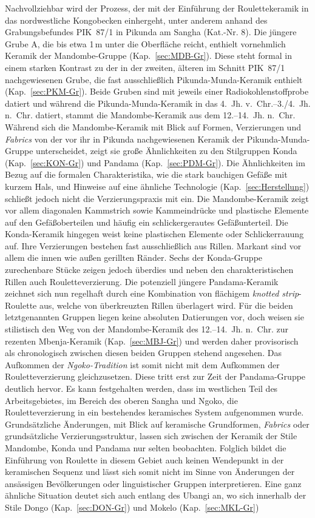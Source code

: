 Nachvollziehbar wird der Prozess, der mit der Einführung der Roulettekeramik in das nordwestliche Kongobecken einhergeht, unter anderem anhand des Grabungsbefundes PIK~87/1 in Pikunda am \mbox{Sangha} (Kat.-Nr. 8). Die jüngere Grube A, die bis etwa 1\,m unter die Oberfläche reicht, enthielt vornehmlich Keramik der Mandombe-Gruppe (Kap.~\ref{sec:MDB-Gr}). Diese steht formal in einem starken Kontrast zu der in der zweiten, älteren im Schnitt PIK~87/1 nachgewiesenen Grube, die fast ausschließlich Pikunda-Munda-Keramik enthielt (Kap.~\ref{sec:PKM-Gr}). Beide Gruben sind mit jeweils einer Radiokohlenstoffprobe datiert und während die Pikunda-Munda-Keramik in das 4.~Jh. v.~Chr.--3./4.~Jh. n.~Chr. datiert, stammt die Mandombe-Keramik aus dem 12.--14.~Jh. n.~Chr. Während sich die Mandombe-Keramik mit Blick auf Formen, Verzierungen und \textit{Fabrics} von der vor ihr in Pikunda nachgewiesenen Keramik der Pikunda-Munda-Gruppe unterscheidet, zeigt sie große Ähnlichkeiten zu den Stilgruppen Konda (Kap.~\ref{sec:KON-Gr}) und Pandama (Kap.~\ref{sec:PDM-Gr}). Die Ähnlichkeiten im Bezug auf die formalen Charakteristika, wie die stark bauchigen Gefäße mit kurzem Hals, und Hinweise auf eine ähnliche Technologie (Kap.~\ref{sec:Herstellung}) schließt jedoch nicht die Verzierungspraxis mit ein. Die Mandombe-Keramik zeigt vor allem diagonalen Kammstrich sowie Kammeindrücke und plastische Elemente auf den Gefäßoberteilen und häufig ein schlickergerautes Gefäßunterteil. Die Konda-Keramik hingegen weist keine plastischen Elemente oder Schlickerrauung auf. Ihre Verzierungen bestehen fast ausschließlich aus Rillen. Markant sind vor allem die innen wie außen gerillten Ränder. Sechs der Konda-Gruppe zurechenbare Stücke zeigen jedoch überdies und neben den charakteristischen Rillen auch Rouletteverzierung. Die potenziell jüngere Pandama-Keramik zeichnet sich nun regelhaft durch eine Kombination von flächigem \textit{knotted strip}-Roulette aus, welche von überkreuzten Rillen überlagert wird. Für die beiden letztgenannten Gruppen liegen keine absoluten Datierungen vor, doch weisen sie stilistisch den Weg von der Mandombe-Keramik des 12.--14.~Jh. n.~Chr. zur rezenten Mbenja-Keramik (Kap.~\ref{sec:MBJ-Gr}) und werden daher provisorisch als chronologisch zwischen diesen beiden Gruppen stehend angesehen. Das Aufkommen der \textit{\mbox{Ngoko}-Tradition} ist somit nicht mit dem Aufkommen der Rouletteverzierung gleichzusetzen. Diese tritt erst zur Zeit der Pandama-Gruppe deutlich hervor. Es kann festgehalten werden, dass im westlichen Teil des Arbeitsgebietes, im Bereich des oberen \mbox{Sangha} und \mbox{Ngoko}, die Rouletteverzierung in ein bestehendes keramisches System aufgenommen wurde. Grundsätzliche Änderungen, mit Blick auf keramische Grundformen, \textit{Fabrics} oder grundsätzliche Verzierungsstruktur, lassen sich zwischen der Keramik der Stile Mandombe, Konda und Pandama nur selten beobachten. Folglich bildet die Einführung von \mbox{Roulette} in diesem Gebiet auch keinen Wendepunkt in der keramischen Sequenz und lässt sich somit nicht im Sinne von Änderungen der ansässigen Bevölkerungen oder linguistischer Gruppen interpretieren. Eine ganz ähnliche Situation deutet sich auch entlang des \mbox{Ubangi} an, wo sich innerhalb der Stile Dongo (Kap.~\ref{sec:DON-Gr}) und Mokelo (Kap.~\ref{sec:MKL-Gr}) 